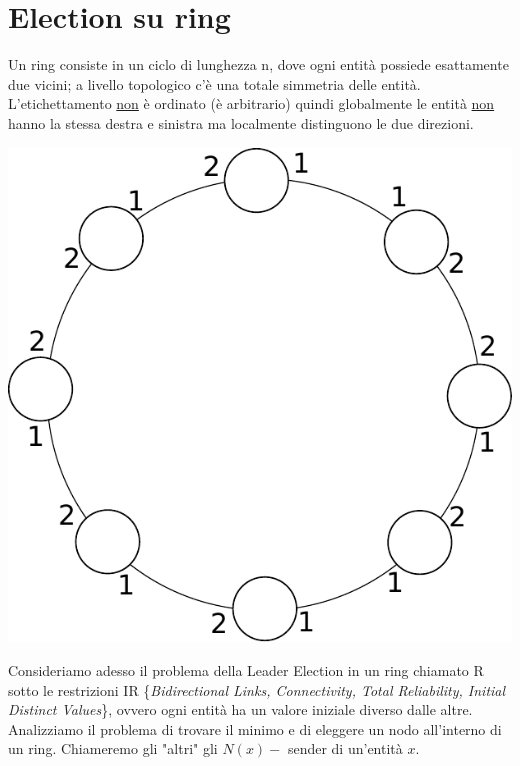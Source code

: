 \section{Election su ring}
Un ring consiste in un ciclo di lunghezza n, dove ogni entità possiede esattamente due vicini; a livello topologico c'è una totale simmetria delle entità.\\ 
L'etichettamento \underline{non} è ordinato (è arbitrario) quindi globalmente le entità \underline{non} hanno la stessa destra e sinistra ma localmente distinguono le due direzioni.
\begin{center}
  \includegraphics[scale=0.5]{images/n_43}
\end{center}
Consideriamo adesso il problema della Leader Election in un ring chiamato R sotto le restrizioni IR \{\textit{Bidirectional Links, Connectivity, Total Reliability, Initial Distinct Values}\}, ovvero ogni entità ha un valore iniziale diverso dalle altre.\\ Analizziamo il problema di trovare il minimo e di eleggere un nodo all'interno di un ring. Chiameremo gli "altri" gli $N(x) - $ sender di un'entità $x$.

